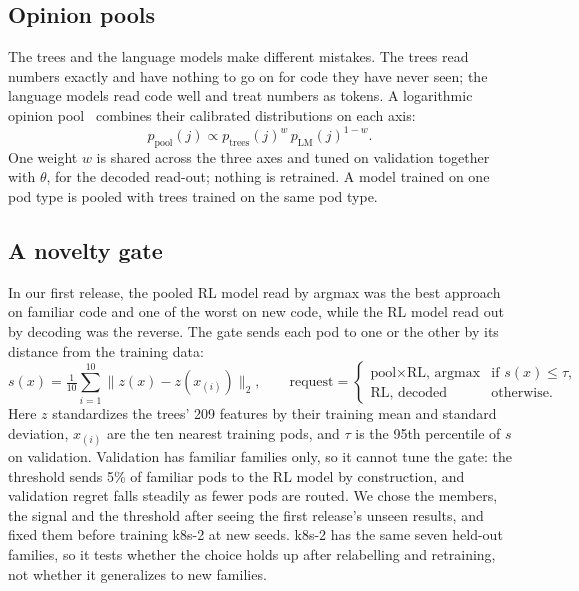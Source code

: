 \subsection{Opinion pools}
The trees and the language models make different mistakes. The trees read numbers exactly and have nothing to go
on for code they have never seen; the language models read code well and treat numbers as tokens. A logarithmic
opinion pool~\citep{genest1986pools} combines their calibrated distributions on each axis:
\begin{equation}
p_{\text{pool}}(j) \propto p_{\text{trees}}(j)^{w}\,p_{\text{LM}}(j)^{1-w}.
\end{equation}
One weight $w$ is shared across the three axes and tuned on validation together with $\theta$, for the decoded
read-out; nothing is retrained. A model trained on one pod type is pooled with trees trained on the same pod type.

\subsection{A novelty gate}
In our first release, the pooled RL model read by argmax was the best approach on familiar code and one of the
worst on new code, while the RL model read out by decoding was the reverse. The gate sends each pod to one or the
other by its distance from the training data:
\begin{equation}
s(x) = \tfrac{1}{10}\textstyle\sum_{i=1}^{10}\lVert z(x) - z(x_{(i)})\rVert_2,\qquad
\text{request} = \begin{cases}\text{pool}\times\text{RL, argmax} & \text{if } s(x)\le\tau,\\ \text{RL, decoded} & \text{otherwise.}\end{cases}
\end{equation}
Here $z$ standardizes the trees' 209 features by their training mean and standard deviation, $x_{(i)}$ are the ten
nearest training pods, and $\tau$ is the 95th percentile of $s$ on validation. Validation has familiar families
only, so it cannot tune the gate: the threshold sends 5\% of familiar pods to the RL model by construction, and
validation regret falls steadily as fewer pods are routed. We chose the members, the signal and the threshold after
seeing the first release's unseen results, and fixed them before training k8s-2 at new seeds. k8s-2 has the same
seven held-out families, so it tests whether the choice holds up after relabelling and retraining, not whether it
generalizes to new families.

